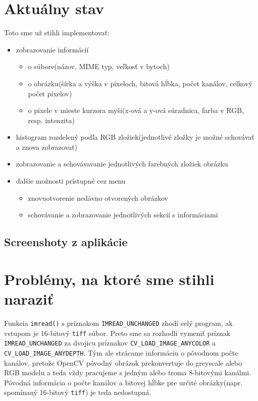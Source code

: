 \documentclass[12pt,a4paper,titlepage,final]{article}
\begin{document}
\section{Aktuálny stav}
Toto sme už stihli implementovať:
\begin{itemize}
	\item zobrazovanie informácií
		\begin{itemize}
			\item o súbore(názov, MIME typ, veľkosť v bytoch)
			\item o obrázku(šírka a výška v pixeloch, bitová hĺbka, počet kanálov, celkový počet pixelov)
			\item o pixele v mieste kurzora myši(x-ová a y-ová súradnica, farba v RGB, resp. intenzita)
		\end{itemize}
	\item histogram rozdelený podľa RGB zložiek(jednotlivé zložky je možné schovávať a znova zobrazovať)
	\item zobrazovanie a schovávavanie jednotlivých farebných zložiek obrázku
	\item ďalšie možnosti prístupné cez menu
		\begin{itemize}
		\item znovuotvorenie nedávno otvorených obrázkov
		\item schovávanie a zobrazovanie jednotlivých sekcií s informáciami 
		\end{itemize}
	
\end{itemize}
\subsection{Screenshoty z aplikácie}

\section{Problémy, na ktoré sme stihli naraziť}
Funkcia \verb|imread()| s príznakom \verb|IMREAD_UNCHANGED| zhodí celý program, ak vstupom je 16-bitový \verb|tiff| súbor. Preto sme sa rozhodli vymeniť príznak \verb|IMREAD_UNCHANGED| za dvojicu príznakov \verb|CV_LOAD_IMAGE_ANYCOLOR| a \verb|CV_LOAD_IMAGE_ANYDEPTH|. Tým ale strácame informáciu o pôvodnom počte kanálov, pretože OpenCV pôvodný obrázok prekonvertuje do greyscale alebo RGB modelu a teda vždy pracujeme s jedným alebo troma 8-bitovými kanálmi. Pôvodná informácia o počte kanálov a bitovej hĺbke pre určité obrázky(napr. spomínaný 16-bitový \verb|tiff|) je teda nedostupná.
\end{document}
